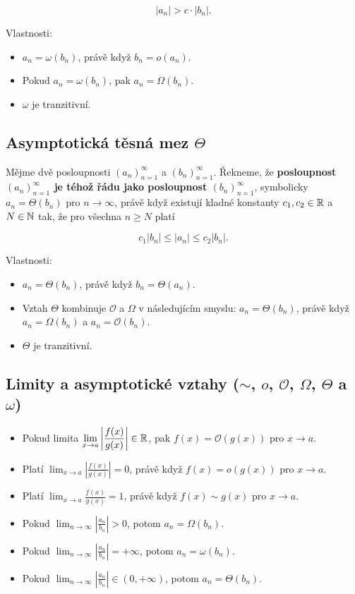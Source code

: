 \[ |a_n| > c \cdot |b_n|. \]

\noindent Vlastnosti:

\begin{itemize}
    \item  $a_n = \omega(b_n)$, právě když $b_n = o(a_n)$.
    \item Pokud $a_n = \omega(b_n)$, pak $a_n = \Omega(b_n)$.
    \item $\omega$ je tranzitivní.
\end{itemize}

\subsection*{Asymptotická těsná mez $\Theta$}

Mějme dvě posloupnosti $(a_n)_{n=1}^\infty$ a $(b_n)_{n=1}^\infty$. Řekneme, že
\textbf{posloupnost $(a_n)_{n=1}^\infty$ je téhož řádu jako posloupnost
    $(b_n)_{n=1}^\infty$}, symbolicky $a_n = \Theta(b_n)$ pro $n \to \infty$, právě
když existují kladné konstanty $c_1,c_2 \in \mathbb{R}$ a $N \in \mathbb{N}$ tak, že pro
všechna $n \geq N$ platí

\[ c_1 |b_n| \leq |a_n| \leq c_2 |b_n|. \]

\noindent Vlastnosti:

\begin{itemize}
    \item $a_n = \Theta(b_n)$, právě když $b_n = \Theta(a_n)$.
    \item Vztah $\Theta$ kombinuje $\mathcal{O}$ a $\Omega$ v následujícím smyslu: $a_n =
              \Theta(b_n)$, právě když $a_n = \Omega(b_n)$ a $a_n = \mathcal{O}(b_n)$.
    \item $\Theta$ je tranzitivní.
\end{itemize}

\subsection*{Limity a asymptotické vztahy ($\sim$, $o$, $\mathcal{O}$, $\Omega$, $\Theta$ a $\omega$)}

\begin{itemize}
    \item Pokud limita $\displaystyle \lim_{x\to a} \left| \frac{f(x)}{g(x)} \right| \in
              \mathbb{R}$, pak $f(x) = \mathcal{O}(g(x))$ pro $x \to a$.
    \item Platí $\displaystyle \lim_{x\to a} \left| \frac{f(x)}{g(x)} \right| = 0$, právě
          když $f(x) = o(g(x))$ pro $x \to a$.
    \item Platí $\displaystyle\lim_{x\to a} \frac{f(x)}{g(x)} = 1$, právě když $f(x) \sim
              g(x)$ pro $x \to a$.
    \item Pokud $\displaystyle \lim_{n\to\infty} \left|\frac{a_n}{b_n}\right| > 0$, potom
          $a_n = \Omega(b_n)$.
    \item Pokud $\displaystyle \lim_{n\to\infty} \left|\frac{a_n}{b_n}\right| = +\infty$,
          potom $a_n = \omega(b_n)$.
    \item Pokud $\displaystyle \lim_{n\to\infty} \left|\frac{a_n}{b_n}\right| \in (0,
              +\infty)$, potom $a_n = \Theta(b_n)$.
\end{itemize}

\pagebreak

